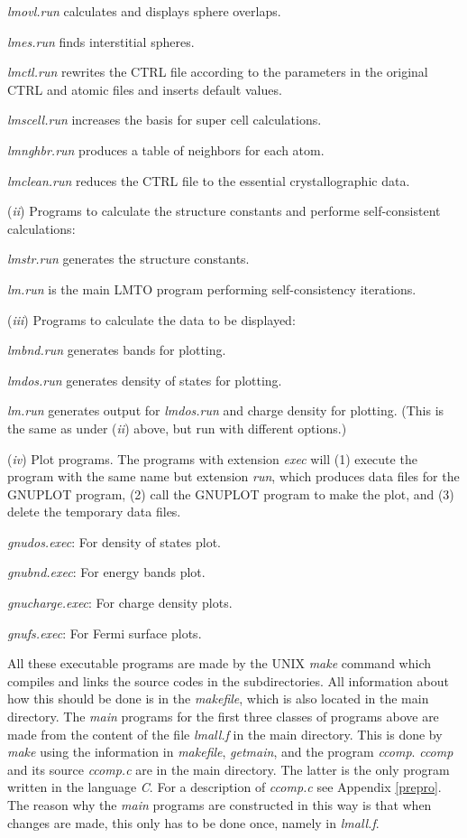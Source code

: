 \documentclass[aps,twocolumn,a4]{revtex4}
\begin{document}
{\em lmovl.run} calculates and displays sphere overlaps.

{\em lmes.run} finds interstitial spheres.

{\em lmctl.run} rewrites the CTRL file according to the parameters in
the original CTRL and atomic files and inserts default values.

{\em lmscell.run} increases the basis for super cell calculations.

{\em lmnghbr.run} produces a table of neighbors for each atom.

{\em lmclean.run} reduces the CTRL file to the essential
crystallographic data.

({\em ii}) Programs to calculate the structure constants
and performe self-consistent calculations:

{\em lmstr.run} generates the structure constants.

{\em lm.run} is the main LMTO program performing self-consistency
iterations.

({\em iii}) Programs to calculate the data to be displayed:

{\em lmbnd.run} generates bands for plotting.

{\em lmdos.run} generates density of states for plotting.

{\em lm.run} generates output for {\em lmdos.run} and charge density
for plotting. (This is the same as under ({\em ii}) above, but run
with different options.)

({\em iv}) Plot programs. The programs with extension {\em exec} will
(1) execute the program with the same name but extension {\em run},
which produces data files for the GNUPLOT program, (2) call the
GNUPLOT program to make the plot, and (3) delete the temporary data
files.

{\em gnudos.exec}: For density of states plot.

{\em gnubnd.exec}: For energy bands plot.

{\em gnucharge.exec}: For charge density plots.

{\em gnufs.exec}: For Fermi surface plots.

All these executable programs are made by the UNIX {\em make} command
which compiles and links the source codes in the subdirectories. All
information about how this should be done is in the {\em makefile},
which is also located in the main directory. The {\em main} programs
for the first three classes of programs above are made from the content
of the file {\em lmall.f} in the main directory. This is done by
{\em make} using the information in {\em makefile}, {\em getmain},
and the program {\em ccomp}.
{\em ccomp} and its source {\em ccomp.c} are in the main directory.
The latter is the only program written in the language {\em C}.
For a description of {\em ccomp.c} see Appendix \ref{prepro}. The reason
why the {\em main} programs are constructed in this way is that when
changes are made, this only has to be done once, namely in
{\em lmall.f}.
\end{document}
